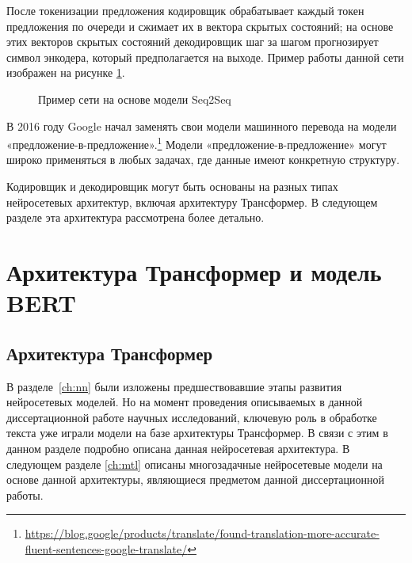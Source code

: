 После токенизации предложения кодировщик обрабатывает каждый токен предложения по очереди и сжимает их в вектора скрытых состояний; на основе этих векторов скрытых состояний декодировщик шаг за шагом прогнозирует символ энкодера, который предполагается на выходе. Пример работы данной сети изображен на рисунке \ref{fig:Neuro6-Seq2Seq}.

\begin{figure}[ht]
 \caption{Пример сети на основе модели Seq2Seq}\label{fig:Neuro6-Seq2Seq}
\end{figure}

В 2016 году Google начал заменять свои модели машинного перевода на модели «предложение-в-предложение».\footnote{\url{https://blog.google/products/translate/found-translation-more-accurate-fluent-sentences-google-translate/}} Модели «предложение-в-предложение» могут широко применяться в любых задачах, где данные имеют конкретную структуру.
  
Кодировщик и декодировщик могут быть основаны на разных типах нейросетевых архитектур, включая архитектуру Трансформер. В следующем разделе эта архитектура рассмотрена более детально.

\section{Архитектура Трансформер и модель BERT}\label{ch:tr}

\subsection{Архитектура Трансформер}

В разделе~\ref{ch:nn} были изложены предшествовавшие этапы развития нейросетевых моделей. Но на момент проведения описываемых в данной диссертационной работе научных исследований, ключевую роль в обработке текста уже играли модели на базе архитектуры Трансформер. В связи с этим в данном разделе подробно описана данная нейросетевая архитектура. В следующем разделе \ref{ch:mtl} описаны многозадачные нейросетевые модели на основе данной архитектуры, являющиеся предметом данной диссертационной работы. 

